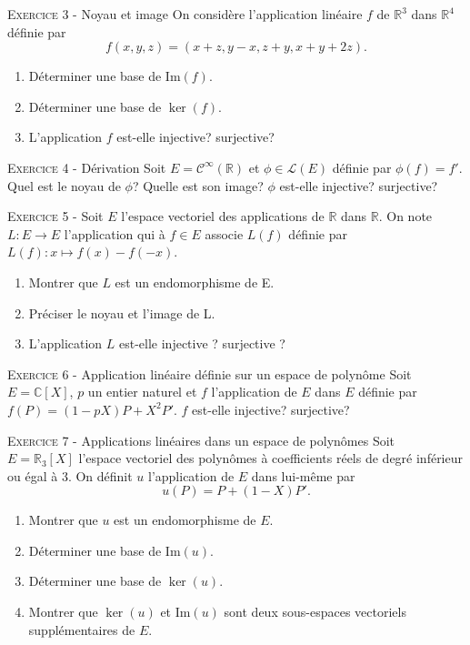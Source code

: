 

\vskip0.3cm\noindent\textsc{Exercice 3} - Noyau et image
\vskip0.2cm
On considère l'application linéaire $f$ de $\mathbb R^3$
dans $\mathbb R^4$ définie par
$$f(x,y,z)=(x+z,y-x,z+y,x+y+2z).$$
\begin{enumerate}
\item Déterminer  une base de $\textrm{Im}(f)$.
\item Déterminer une base de $\ker(f)$.
\item L'application $f$ est-elle injective? surjective?
\end{enumerate}




\vskip0.3cm\noindent\textsc{Exercice 4} - Dérivation
\vskip0.2cm
Soit $E=\mathcal C^{\infty}(\mathbb R)$ et $\phi\in\mathcal L(E)$ définie par $\phi(f)=f'$. Quel est le noyau de $\phi$? Quelle est son image? $\phi$ est-elle injective? surjective?




\vskip0.3cm\noindent\textsc{Exercice 5} - 
\vskip0.2cm
Soit $E$ l’espace vectoriel des applications de $\mathbb R$ dans $\mathbb R$. On note $L:E\to E$ l’application qui à $f\in E$ associe $L(f)$ définie par $L(f):x\mapsto f(x)−f(−x)$.
\begin{enumerate}
\item Montrer que $L$ est un endomorphisme de E.
\item Préciser le noyau et l’image de L.
\item L’application $L$ est-elle injective ? surjective ?
\end{enumerate}




\vskip0.3cm\noindent\textsc{Exercice 6} - Application linéaire définie sur un espace de polynôme
\vskip0.2cm
Soit $E=\mathbb C[X]$, $p$ un entier naturel et $f$ l'application de $E$ dans $E$ définie par
$f(P)=(1-pX)P+X^2P'$. $f$ est-elle injective? surjective?





\vskip0.3cm\noindent\textsc{Exercice 7} - Applications linéaires dans un espace de polynômes
\vskip0.2cm
Soit $E=\mathbb R_3[X]$ l'espace vectoriel des polynômes à coefficients réels de degré inférieur ou égal à 3.
On définit $u$ l'application de $E$ dans lui-même par
$$u(P)=P+(1-X)P'.$$
\begin{enumerate}
\item Montrer que $u$ est un endomorphisme de $E$.
\item Déterminer une base de $\textrm{Im}(u)$.
\item Déterminer une base de $\ker(u)$.
\item Montrer que $\ker(u)$ et $\textrm{Im}(u)$ sont deux sous-espaces
vectoriels supplémentaires de $E$.
\end{enumerate}



